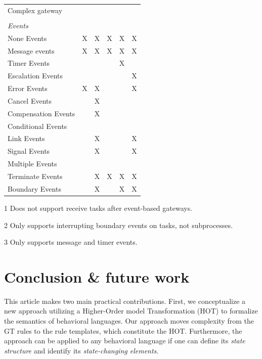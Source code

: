 \documentclass{lmcs} %
\begin{document}
\begin{table}[htbp]
\begin{threeparttable}
\begin{tabular}{l l l l l l}
      Complex gateway & & & & &\\
      \\
      \textit{Events} \\
      None Events & X & X & X & X & X\\
      Message events & X & X & X & X & X\\
      Timer Events & & & & X & \\
      Escalation Events & & & & & X\\
      Error Events & X & X & & & X\\
      Cancel Events & & X & & &\\
      Compensation Events & & X & & &\\
      Conditional Events & & & & &\\
      Link Events & & X & & & X\\
      Signal Events & & X & & & X\\
      Multiple Events & &  & & & \\
      Terminate Events & & X & X & X & X\\
      Boundary Events & & X\tnote{2} & & X\tnote{3} & X\\ %
    \end{tabular}
    \begin{tablenotes}
        \item[1] Does not support receive tasks after event-based gateways.
        \item[2] Only supports interrupting boundary events on tasks, not subprocesses.
        \item[3] Only supports message and timer events.
    \end{tablenotes}
    \end{threeparttable}
\end{table}


\section{Conclusion \& future work} \label{sec:conclusion}
This article makes two main practical contributions.
First, we conceptualize a new approach utilizing a Higher-Order model Transformation (HOT) to formalize the semantics of behavioral languages.
Our approach moves complexity from the GT rules to the rule templates, which constitute the HOT.
Furthermore, the approach can be applied to any behavioral language if one can define its \textit{state structure} and identify its \textit{state-changing elements}.
\end{document}
